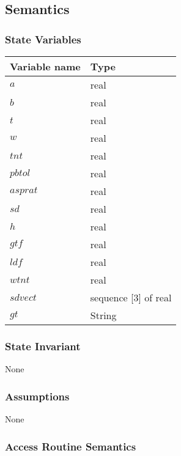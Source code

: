 \documentclass[12pt,fleqn]{article}
\begin{document}
\subsection* {Semantics}

\subsubsection* {State Variables}

\begin{tabular}{| l | l |}
\hline
\textbf{Variable name} & \textbf{Type}\\
\hline
$a$ & real\\
\hline
$b$ & real\\
\hline
$t$ & real\\
\hline
$w$ & real\\
\hline
$tnt$ & real\\
\hline
$pbtol$ & real\\
\hline
$asprat$ & real\\
\hline
$sd$ & real\\
\hline
$h$ & real\\
\hline
$gtf$ & real\\
\hline
$ldf$ & real\\
\hline
$wtnt$ & real\\
\hline
$sdvect$ & sequence [3] of real\\
\hline
$gt$ & String\\
\hline
\end{tabular}

\subsubsection* {State Invariant}
None

\subsubsection* {Assumptions}
None

\subsubsection* {Access Routine Semantics}
\end{document}
